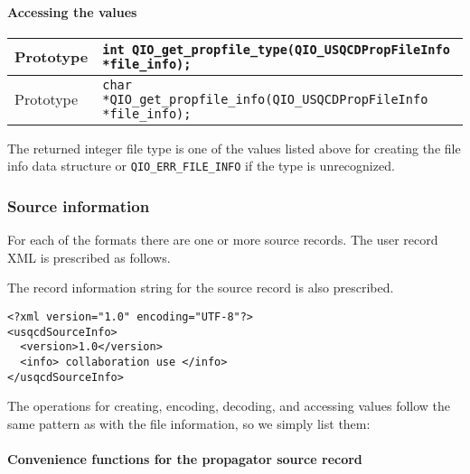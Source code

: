\documentclass{article}
\begin{document}
\paragraph{Accessing the values}

\begin{flushleft}
  \begin{tabular}{|l|l|}
  \hline
  Prototype      & \verb|int QIO_get_propfile_type(QIO_USQCDPropFileInfo *file_info);|\\
    \hline
  Prototype      & \verb|char *QIO_get_propfile_info(QIO_USQCDPropFileInfo *file_info);|\\
  \hline
 \end{tabular}
\end{flushleft}
%

The returned integer file type is one of the values listed above for
creating the file info data structure or \verb|QIO_ERR_FILE_INFO| if
the type is unrecognized.

\subsubsection{Source information}

For each of the formats there are one or more source records.  The user
record XML is prescribed as follows.

The record information string for the source record is also
prescribed.

\begin{verbatim}
<?xml version="1.0" encoding="UTF-8"?>
<usqcdSourceInfo>
  <version>1.0</version>
  <info> collaboration use </info>
</usqcdSourceInfo>
\end{verbatim}

The operations for creating, encoding, decoding, and accessing values
follow the same pattern as with the file information, so we simply
list them:

\paragraph{Convenience functions for the propagator source record}
\end{document}
